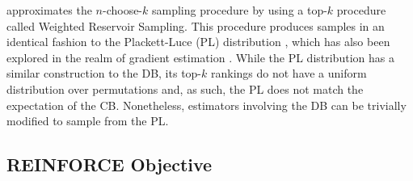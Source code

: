 \documentclass{article}
\begin{document}
\citet{xieReparameterizableSubsetSampling2019} approximates the $n$-choose-$k$
sampling procedure by using a top-$k$ procedure called Weighted Reservoir
Sampling. This procedure produces samples in an identical fashion to the
Plackett-Luce (PL) distribution \cite{yellottRelationshipLuceChoice1977}, which
has also been explored in the realm of gradient estimation
\cite{gadetskyLowvarianceBlackboxGradient2020}. While the PL distribution has a
similar construction to the DB, its top-$k$ rankings do not have a uniform
distribution over permutations and, as such, the PL does not match the
expectation of the CB. Nonetheless, estimators involving the DB can be
trivially modified to sample from the PL.

\subsection{REINFORCE Objective} \label{sec:reinforce}
\end{document}

